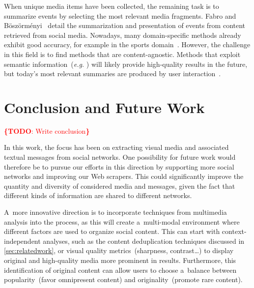 \documentclass{acm_proc_article-sp}
\let\oldemph\emph
\renewcommand{\emph}[1]{\oldemph{\fontsize{9}{9}\selectfont #1}}
\newcommand{\todo}[1]{\noindent\textcolor{red}{{\bf \{TODO}: #1{\bf \}}}}
\begin{document}
When unique media items have been collected, the remaining task is to summarize events by selecting the most relevant media fragments. Fabro and B\"osz\"orm\'enyi~\cite{Fabro:MMM12} detail the summarization and presentation of events from content retrieved from social media. Nowadays, many domain-specific methods already exhibit good accuracy, for example in the sports domain~\cite{Li1,Li2}. However, the challenge in this field is to find methods that are content-agnostic. Methods that exploit semantic information~(\emph{e.g.} \cite{Chen}) will likely provide high-quality results in the future, but today's most relevant summaries are produced by user interaction~\cite{Olsen}.


\section{Conclusion and Future Work}                                        \label{sec:conclusion}
\todo{Write conclusion}

In this work, the focus has been on extracting visual media and associated textual messages from social networks.
One possibility for future work would therefore be to pursue our efforts in this direction by supporting more social networks and improving our Web scrapers.
This could significantly improve the quantity and diversity of considered media and messages,
given the fact that different kinds of information are shared to different networks.

A~more innovative direction is to incorporate techniques from multimedia analysis into the process,
as this will create a~multi-modal environment where different factors are used to organize social content.
This can start with context-independent analyses, such as the content deduplication techniques discussed in \autoref{sec:relatedwork},
or visual quality metrics~(sharpness, contrast\ldots) to display original and high-quality media more prominent in results.
Furthermore, this identification of original content can allow users to choose a~balance between popularity~(favor omnipresent content) and originality~(promote rare content).
\end{document}
